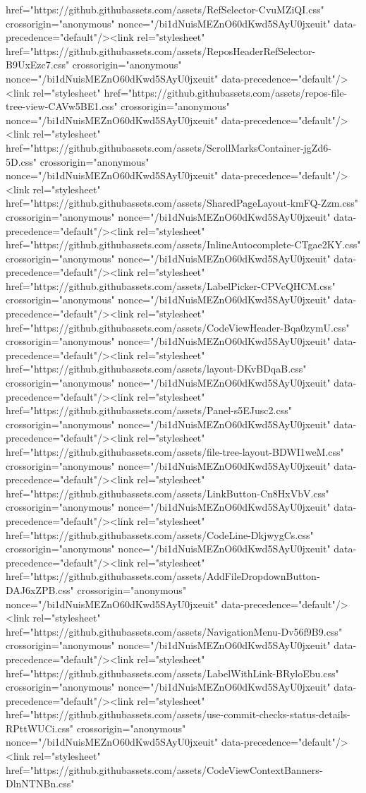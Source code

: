 href="https://github.githubassets.com/assets/RefSelector-CvuMZiQI.css" crossorigin="anonymous" nonce="/bi1dNuisMEZnO60dKwd5SAyU0jxeuit" data-precedence="default"/><link rel="stylesheet" href="https://github.githubassets.com/assets/ReposHeaderRefSelector-B9UxEzc7.css" crossorigin="anonymous" nonce="/bi1dNuisMEZnO60dKwd5SAyU0jxeuit" data-precedence="default"/><link rel="stylesheet" href="https://github.githubassets.com/assets/repos-file-tree-view-CAVw5BE1.css" crossorigin="anonymous" nonce="/bi1dNuisMEZnO60dKwd5SAyU0jxeuit" data-precedence="default"/><link rel="stylesheet" href="https://github.githubassets.com/assets/ScrollMarksContainer-jgZd6-5D.css" crossorigin="anonymous" nonce="/bi1dNuisMEZnO60dKwd5SAyU0jxeuit" data-precedence="default"/><link rel="stylesheet" href="https://github.githubassets.com/assets/SharedPageLayout-kmFQ-Zzm.css" crossorigin="anonymous" nonce="/bi1dNuisMEZnO60dKwd5SAyU0jxeuit" data-precedence="default"/><link rel="stylesheet" href="https://github.githubassets.com/assets/InlineAutocomplete-CTgae2KY.css" crossorigin="anonymous" nonce="/bi1dNuisMEZnO60dKwd5SAyU0jxeuit" data-precedence="default"/><link rel="stylesheet" href="https://github.githubassets.com/assets/LabelPicker-CPVcQHCM.css" crossorigin="anonymous" nonce="/bi1dNuisMEZnO60dKwd5SAyU0jxeuit" data-precedence="default"/><link rel="stylesheet" href="https://github.githubassets.com/assets/CodeViewHeader-Bqa0zymU.css" crossorigin="anonymous" nonce="/bi1dNuisMEZnO60dKwd5SAyU0jxeuit" data-precedence="default"/><link rel="stylesheet" href="https://github.githubassets.com/assets/layout-DKvBDqaB.css" crossorigin="anonymous" nonce="/bi1dNuisMEZnO60dKwd5SAyU0jxeuit" data-precedence="default"/><link rel="stylesheet" href="https://github.githubassets.com/assets/Panel-s5EJusc2.css" crossorigin="anonymous" nonce="/bi1dNuisMEZnO60dKwd5SAyU0jxeuit" data-precedence="default"/><link rel="stylesheet" href="https://github.githubassets.com/assets/file-tree-layout-BDWI1weM.css" crossorigin="anonymous" nonce="/bi1dNuisMEZnO60dKwd5SAyU0jxeuit" data-precedence="default"/><link rel="stylesheet" href="https://github.githubassets.com/assets/LinkButton-Cn8HxVbV.css" crossorigin="anonymous" nonce="/bi1dNuisMEZnO60dKwd5SAyU0jxeuit" data-precedence="default"/><link rel="stylesheet" href="https://github.githubassets.com/assets/CodeLine-DkjwygCs.css" crossorigin="anonymous" nonce="/bi1dNuisMEZnO60dKwd5SAyU0jxeuit" data-precedence="default"/><link rel="stylesheet" href="https://github.githubassets.com/assets/AddFileDropdownButton-DAJ6xZPB.css" crossorigin="anonymous" nonce="/bi1dNuisMEZnO60dKwd5SAyU0jxeuit" data-precedence="default"/><link rel="stylesheet" href="https://github.githubassets.com/assets/NavigationMenu-Dv56f9B9.css" crossorigin="anonymous" nonce="/bi1dNuisMEZnO60dKwd5SAyU0jxeuit" data-precedence="default"/><link rel="stylesheet" href="https://github.githubassets.com/assets/LabelWithLink-BRyloEbu.css" crossorigin="anonymous" nonce="/bi1dNuisMEZnO60dKwd5SAyU0jxeuit" data-precedence="default"/><link rel="stylesheet" href="https://github.githubassets.com/assets/use-commit-checks-status-details-RPttWUCi.css" crossorigin="anonymous" nonce="/bi1dNuisMEZnO60dKwd5SAyU0jxeuit" data-precedence="default"/><link rel="stylesheet" href="https://github.githubassets.com/assets/CodeViewContextBanners-DlnNTNBn.css" 